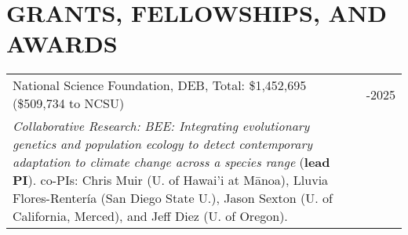\documentclass[11pt,english]{article}\usepackage[]{graphicx}\usepackage[]{color}
\providecommand{\tabularnewline}{\\}
\begin{document}

\vspace{2ex}
\section*{GRANTS, FELLOWSHIPS, AND AWARDS}
\vspace{-0.5ex}

\renewcommand{\arraystretch}{1.2}
\begin{tabularx}{\textwidth}{@{}>{\raggedright}p{5.25in} >{\raggedleft}X@{}}

National Science Foundation, DEB, Total: \$1,452,695 (\$509,734 to NCSU) & 2022-2025 \tabularnewline
\addtolength{\leftskip}{5ex}\emph{Collaborative Research: BEE: Integrating evolutionary genetics and population ecology to detect contemporary adaptation to climate change across a species range} (\textbf{lead PI}). co-PIs: Chris Muir (U. of Hawai'i at M\={a}noa), Lluvia Flores-Renter\'{i}a (San Diego State U.), Jason Sexton (U. of California, Merced), and Jeff Diez (U. of Oregon). \tabularnewline

\end{tabularx}
\end{document}
